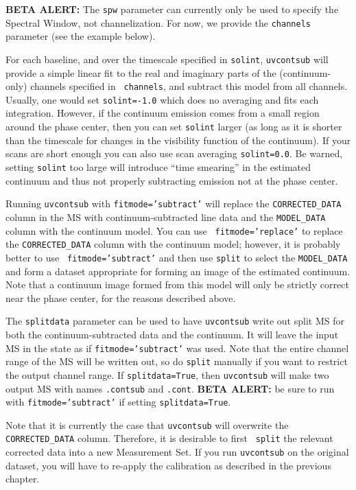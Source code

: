 {\bf BETA ALERT:} The {\tt spw} parameter can currently only be used
to specify the Spectral Window, not channelization.  For now, we
provide the {\tt channels} parameter (see the example below).

For each baseline, and over the timescale specified in {\tt solint},
{\tt uvcontsub} will provide a simple linear fit to the real and
imaginary parts of the (continuum-only) channels specified in {\tt
channels}, and subtract this model from all channels.  
Usually, one would set {\tt solint=-1.0} which does no
averaging and fits each integration.  However, if the continuum
emission comes from a small region around the phase center, then
you can set {\tt solint} larger (as long as it is 
shorter than the timescale for changes in the
visibility function of the continuum).
If your scans are short enough you can also use scan averaging 
{\tt solint=0.0}.  Be warned, setting {\tt solint} too large will
introduce ``time smearing'' in the estimated continuum and thus not
properly subtracting emission not at the phase center.  

Running {\tt uvcontsub} with {\tt fitmode='subtract'} will replace the
{\tt CORRECTED\_DATA} column in the MS with continuum-subtracted line data
and the {\tt MODEL\_DATA} column with the continuum model.  You can use {\tt
fitmode='replace'} to replace the {\tt CORRECTED\_DATA} column with the
continuum model; however, it is probably better to use {\tt
fitmode='subtract'} and then use {\tt split} to select the {\tt MODEL\_DATA}
and form a dataset appropriate for forming an image of the estimated
continuum.  Note that a continuum image formed from this model will
only be strictly correct near the phase center, for the reasons
described above.

The {\tt splitdata} parameter can be used to have {\tt uvcontsub}
write out split MS for both the continuum-subtracted data and the
continuum.  It will leave the input MS in the state as if 
{\tt fitmode='subtract'} was used.  Note that the entire channel
range of the MS will be written out, so do {\tt split} manually
if you want to restrict the output channel range.
If {\tt splitdata=True}, then {\tt uvcontsub} will make two output
MS with names {\tt <input msname>.contsub} and {\tt <input msname>.cont}.
{\bf BETA ALERT:} be sure to
run with {\tt fitmode='subtract'} if setting {\tt splitdata=True}.

Note that it is currently the case that {\tt uvcontsub} will overwrite
the {\tt CORRECTED\_DATA} column. Therefore, it is desirable to first {\tt
split} the relevant corrected data into a new Measurement Set.  
If you run {\tt uvcontsub} on the original dataset, you will
have to re-apply the calibration as described in the previous chapter.

